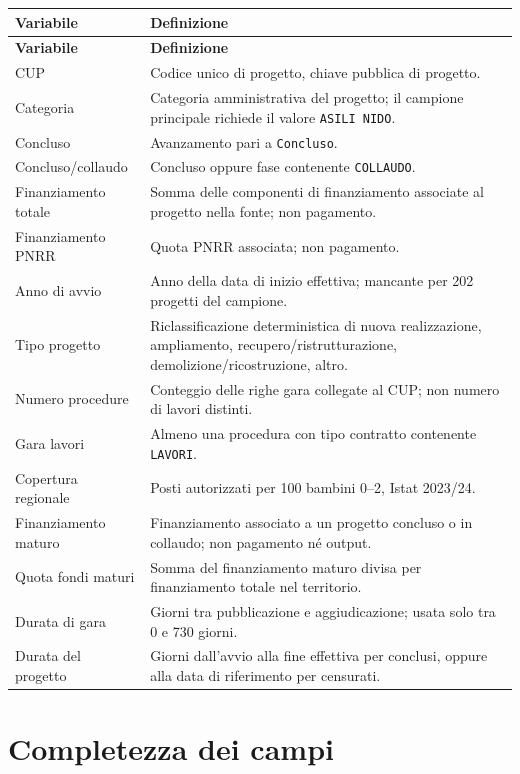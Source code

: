 \documentclass[10pt,a4paper]{article}
\begin{document}
\begin{longtable}{p{}p{}}
\toprule
\textbf{Variabile} & \textbf{Definizione} \\
\midrule
\endfirsthead
\toprule
\textbf{Variabile} & \textbf{Definizione} \\
\midrule
\endhead
CUP & Codice unico di progetto, chiave pubblica di progetto. \\
Categoria & Categoria amministrativa del progetto; il campione principale richiede il valore \texttt{ASILI NIDO}. \\
Concluso & Avanzamento pari a \texttt{Concluso}. \\
Concluso/collaudo & Concluso oppure fase contenente \texttt{COLLAUDO}. \\
Finanziamento totale & Somma delle componenti di finanziamento associate al progetto nella fonte; non pagamento. \\
Finanziamento PNRR & Quota PNRR associata; non pagamento. \\
Anno di avvio & Anno della data di inizio effettiva; mancante per 202 progetti del campione. \\
Tipo progetto & Riclassificazione deterministica di nuova realizzazione, ampliamento, recupero/ristrutturazione, demolizione/ricostruzione, altro. \\
Numero procedure & Conteggio delle righe gara collegate al CUP; non numero di lavori distinti. \\
Gara lavori & Almeno una procedura con tipo contratto contenente \texttt{LAVORI}. \\
Copertura regionale & Posti autorizzati per 100 bambini 0--2, Istat 2023/24. \\
Finanziamento maturo & Finanziamento associato a un progetto concluso o in collaudo; non pagamento né output. \\
Quota fondi maturi & Somma del finanziamento maturo divisa per finanziamento totale nel territorio. \\
Durata di gara & Giorni tra pubblicazione e aggiudicazione; usata solo tra 0 e 730 giorni. \\
Durata del progetto & Giorni dall'avvio alla fine effettiva per conclusi, oppure alla data di riferimento per censurati. \\
\bottomrule
\end{longtable}

\section{Completezza dei campi}
\end{document}
